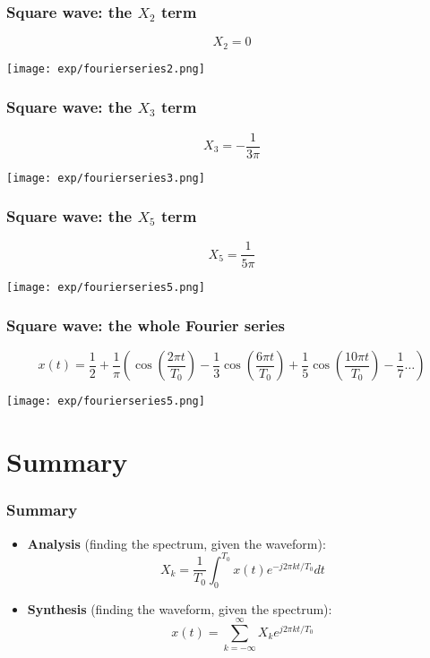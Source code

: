 \documentclass{beamer}
\begin{document}
\begin{frame}
  \frametitle{Square wave: the $X_2$ term}
    \[
    X_2 = 0
    \]
  \centerline{\texttt{[image: exp/fourierseries2.png]}}
\end{frame}

\begin{frame}
  \frametitle{Square wave: the $X_3$ term}
    \[
    X_3 = -\frac{1}{3\pi}
    \]
  \centerline{\texttt{[image: exp/fourierseries3.png]}}
\end{frame}

\begin{frame}
  \frametitle{Square wave: the $X_5$ term}
    \[
    X_5 = \frac{1}{5\pi}
    \]
  \centerline{\texttt{[image: exp/fourierseries5.png]}}
\end{frame}

\begin{frame}
  \frametitle{Square wave: the whole Fourier series}
    \[
    x(t) = \frac{1}{2} + \frac{1}{\pi}\left(\cos\left(\frac{2\pi t}{T_0}\right)-\frac{1}{3}\cos\left(\frac{6\pi t}{T_0}\right)+\frac{1}{5}\cos\left(\frac{10\pi t}{T_0}\right)-\frac{1}{7}\ldots\right)
    \]
  \centerline{\texttt{[image: exp/fourierseries5.png]}}
\end{frame}

\section[Summary]{Summary}
\setcounter{subsection}{1}

\begin{frame}
  \frametitle{Summary}
  \begin{itemize}
  \item {\bf Analysis}  (finding the spectrum, given the waveform):
    \[
    X_k = \frac{1}{T_0}\int_0^{T_0} x(t)e^{-j2\pi kt/T_0}dt
    \]
  \item {\bf Synthesis}  (finding the waveform, given the spectrum):
    \[
    x(t) = \sum_{k=-\infty}^\infty X_k e^{j2\pi kt/T_0}
    \]
  \end{itemize}
\end{frame}  
        
\end{document}

